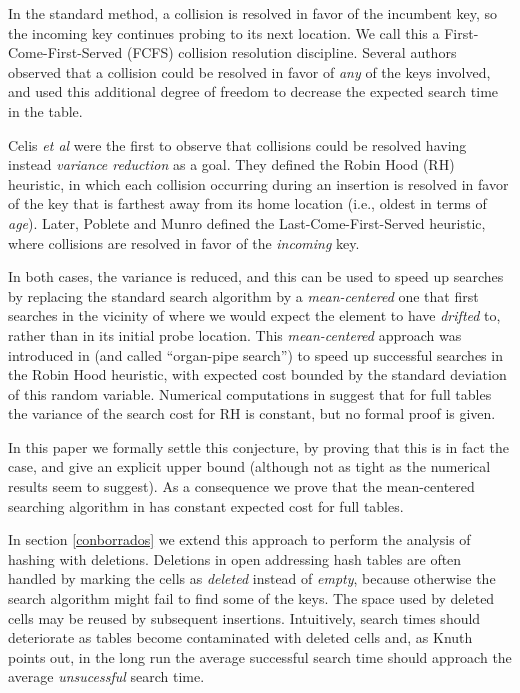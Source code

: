 \documentclass[proceedings]{aofa}
\begin{document}
In the standard method, a collision is resolved in favor of the incumbent key, so the incoming key continues probing to its next location.
We call this a First-Come-First-Served (FCFS) collision resolution discipline.
Several authors \cite{Brent,Amble,GM} observed that a collision could be
resolved in favor of {\it{any}} of the keys involved, and used this
additional degree of freedom to decrease the expected search time in the
table.

Celis {\it{et al}} \cite{CelisT,Celis} were the first to
observe that
collisions could be resolved having instead {\it{variance reduction}} as a goal.
They defined the Robin Hood (RH) heuristic, in which each collision occurring
during an insertion is resolved in
favor of the key that is farthest away from its home location (i.e., oldest in terms of {\em age}).
Later, Poblete and Munro \cite{LCFS} defined the Last-Come-First-Served
heuristic,
where collisions are resolved in favor of the {\em incoming} key. 

In both cases,
the variance is reduced, and this can be used to speed up searches by
replacing
the standard search algorithm by a {\em mean-centered} one that first
searches in the vicinity of where we would expect the element to have
{\em drifted} to, rather than in its initial probe location.
This {\em mean-centered} approach was introduced in
\cite{CelisT} (and called ``organ-pipe search'') to speed up successful searches 
in the Robin Hood heuristic, 
with expected cost bounded by the standard deviation of this random variable. 
Numerical computations in \cite{CelisT} suggest that for
full tables the variance of the search cost for RH is constant, but no formal proof is given. 

In this paper we formally settle this conjecture, by proving that this is
in fact the case, and give an explicit upper bound (although not as tight
as the numerical results seem to suggest). As a consequence we prove
that the mean-centered searching algorithm in \cite{CelisT} has constant
expected cost for full tables.


In section \ref{conborrados} we extend this approach
to perform the analysis of hashing with deletions. 
Deletions in open addressing hash tables are often handled by marking the
cells as {\em deleted} instead of {\em empty}, because otherwise the
search algorithm might fail to find some of the keys.
The space used by deleted cells may be reused by subsequent
insertions.
Intuitively, search times should deteriorate as tables become
contaminated with deleted cells and, as Knuth\cite{Knuth3} points out,
in the long run the average successful search time should approach the
average {\em unsucessful} search time.
\end{document}
